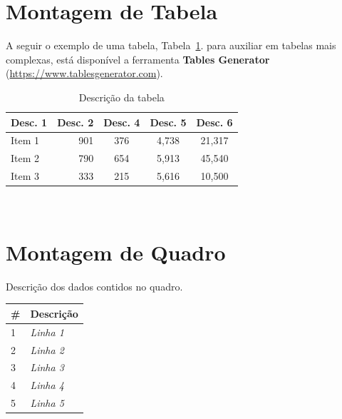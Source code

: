 	\section{Montagem de Tabela}
	\label{sec:tabela}
		A seguir o exemplo de uma tabela, Tabela~\ref{tab:tab_identificador}. para auxiliar em tabelas mais complexas, está disponível a ferramenta \textbf{Tables Generator} (\href{https://www.tablesgenerator.com/}{https://www.tablesgenerator.com}).
		\begin{table}[!ht]
			\centering
				\caption{Descrição da tabela}
				\label{tab:tab_identificador}
				\begin{tabular*}{\columnwidth}{@{\extracolsep{\fill}}lrccc@{}}
					\toprule[1pt]{}\textbf{Desc. 1} & \textbf{Desc. 2} & \textbf{Desc. 4} & \textbf{Desc. 5} & \textbf{Desc. 6}\\\hline
					Item 1		& 901     	& 376  	& 4,738 & 21,317	\\
					Item 2		& 790		& 654  	& 5,913 & 45,540	\\
					Item 3 		& 333		& 215  	& 5,616 & 10,500	\\
					\bottomrule[1pt]
				\end{tabular*}
				\raggedright
				 \\%
		\end{table}

	\section{Montagem de Quadro}
	\label{sec:quadro}
		\begin{quadros}[ht!]
			\caption{Descrição dos dados contidos no quadro.}
			\label{quad:contribuicoes_annals}
				\centering
				\begin{small}
					\def\arraystretch{1.1}
					\begin{tabular}{|p{1.0cm}|p{14.0cm}|}
						\hline
						\textbf{\#} & \textbf{Descrição} \\\hline
						1	& \textit{Linha 1} \\\hline
						2	& \textit{Linha 2} \\\hline
						3	& \textit{Linha 3} \\\hline
						4	& \textit{Linha 4} \\\hline
						5	& \textit{Linha 5} \\\hline
					\end{tabular}
				\end{small}
		\end{quadros}

